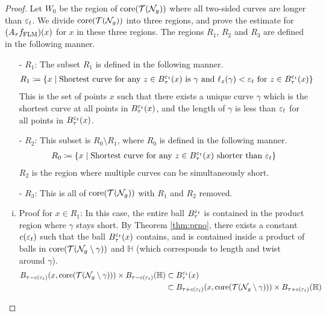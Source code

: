 \begin{proof}
  Let $W_0$ be the region of $\mathrm{core}(\mathcal{T}(\mathcal{N}_g))$ where all two-sided curves are longer than $\varepsilon_t$.
  We divide $\mathrm{core}(\mathcal{T}(\mathcal{N}_g))$ into three regions, and prove the estimate for $(A_\tau f_{\mathrm{FLM}})(x)$ for $x$ in these three regions.
  The regions $R_1$, $R_2$ and $R_3$ are defined in the following manner.
  \begin{itemize}
  \item[-] $R_1$: The subset $R_1$ is defined in the following manner.
    \begin{align*}
      R_1 \coloneqq \left\{ x \mid \text{Shortest curve for any $z \in B_{\tau}^{\varepsilon_t}(x)$ is $\gamma$ and $\ell_z(\gamma) < \varepsilon_t$ for $z \in B_{\tau}^{\varepsilon_t}(x)$} \right\}
    \end{align*}
    This is the set of points $x$ such that there exists a unique curve $\gamma$ which is the shortest curve at all points in $B_{\tau}^{\varepsilon_t}(x)$, and the length of $\gamma$ is less than $\varepsilon_t$ for all points in $B_{\tau}^{\varepsilon_t}(x)$.
  \item[-] $R_2$: This subset is $R_0 \setminus R_1$, where $R_0$ is defined in the following manner.
    \begin{align*}
      R_0 \coloneqq \left\{ x \mid \text{Shortest curve for any $z \in B_{\tau}^{\varepsilon_t}(x)$ shorter than $\varepsilon_t$} \right\}
    \end{align*}
    $R_2$ is the region where multiple curves can be simultaneously short.
  \item[-] $R_3$: This is all of $\mathrm{core}(\mathcal{T}(\mathcal{N}_g))$ with $R_1$ and $R_2$ removed.
\end{itemize}
  \begin{enumerate}[(i)]
  \item Proof for $x \in R_1$: In this case, the entire ball $B_{\tau}^{\varepsilon_t}$ is contained in the product region where $\gamma$ stays short.
    By Theorem \ref{thm:prno}, there exists a constant $c(\varepsilon_t)$ such that the ball $B_{\tau}^{\varepsilon_t}(x)$ contains, and is contained inside a product of balls in $\mathrm{core}(\mathcal{T}(\mathcal{N}_g \setminus \gamma))$ and $\mathbb{H}$ (which corresponds to length and twist around $\gamma$).
    \begin{align*}
      B_{\tau - c(\varepsilon_t)}(x, \mathrm{core}(\mathcal{T}(\mathcal{N}_g \setminus \gamma))) \times B_{\tau - c(\varepsilon_t)}(\mathbb{H}) &\subset B_{\tau}^{\varepsilon_t}(x) \\
      &\subset B_{\tau + c(\varepsilon_t)}(x, \mathrm{core}(\mathcal{T}(\mathcal{N}_g \setminus \gamma))) \times B_{\tau + c(\varepsilon_t)}(\mathbb{H})
    \end{align*}

\end{enumerate}
\end{proof}
